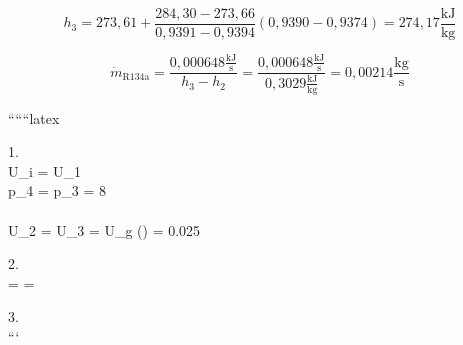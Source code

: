 \[
h_3 = 273,61 + \frac{284,30 - 273,66}{0,9391 - 0,9394} (0,9390 - 0,9374) = 274,17 \frac{\text{kJ}}{\text{kg}}
\]

\[
\dot{m}_{\text{R134a}} = \frac{0,000648 \frac{\text{kJ}}{\text{s}}}{h_3 - h_2} = \frac{0,000648 \frac{\text{kJ}}{\text{s}}}{0,3029 \frac{\text{kJ}}{\text{kg}}} = 0,00214 \frac{\text{kg}}{\text{s}}
\]

``````latex


1. \\
 \Rightarrow U_i = U_1 \\
 \Rightarrow p_4 = p_3 = 8  \\
 \\
\Rightarrow U_2 = U_3 = U_g () = 0.025  \\
\Rightarrow

\begin{figure}[h]
\centering
{}
\end{figure}

2. \\
 =  = 

3. \\
```